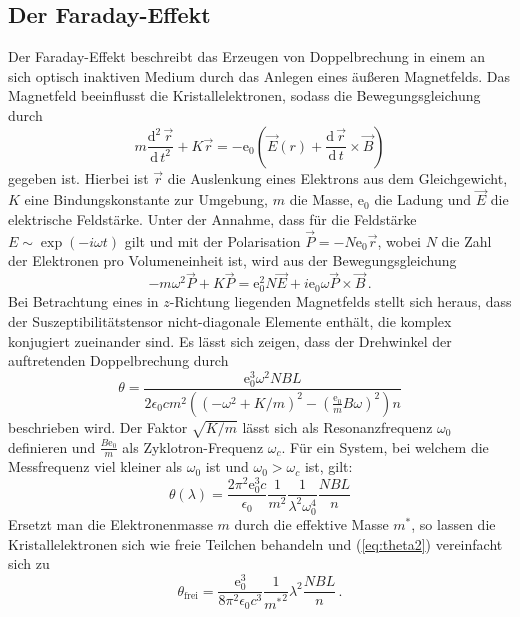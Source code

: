 \subsection{Der Faraday-Effekt}
Der Faraday-Effekt beschreibt das Erzeugen von Doppelbrechung in einem an sich optisch inaktiven Medium durch das Anlegen eines äußeren Magnetfelds. Das Magnetfeld beeinflusst die Kristallelektronen, sodass die Bewegungsgleichung durch
\begin{equation}
  m\frac{\text{d}^2\,\vec{r}}{\text{d}\,t^2}+K\vec{r}=-\text{e}_0\left(\vec{E}(r)+\frac{\text{d}\,\vec{r}}{\text{d}\,t}\times\vec{B}\right)
\end{equation}
gegeben ist. Hierbei ist $\vec{r}$ die Auslenkung eines Elektrons aus dem Gleichgewicht, $K$ eine Bindungskonstante zur Umgebung, $m$ die Masse, e$_0$ die Ladung und $\vec{E}$ die elektrische Feldstärke.
Unter der Annahme, dass für die Feldstärke $E\sim\exp(-i\omega t)$ gilt und mit der Polarisation $\vec{P}=-N\text{e}_0\vec{r}$, wobei $N$ die Zahl der Elektronen pro Volumeneinheit ist, wird aus der Bewegungsgleichung
\begin{equation}
-m\omega^2\vec{P}+K\vec{P}=\text{e}_0^2N\vec{E}+i\text{e}_0\omega\vec{P}\times\vec{B}\,.
\end{equation}
Bei Betrachtung eines in $z$-Richtung liegenden Magnetfelds stellt sich heraus, dass der Suszeptibilitätstensor nicht-diagonale Elemente enthält, die komplex konjugiert zueinander sind.
Es lässt sich zeigen, dass der Drehwinkel der auftretenden Doppelbrechung durch
\begin{equation}
\theta=\frac{\text{e}_0^3\omega^2NBL}{2\epsilon_0cm^2\left(\left(-\omega^2+K/m\right)^2-\left(\frac{\text{e}_0}{m}B\omega\right)^2\right)n}
\end{equation}
beschrieben wird. Der Faktor $\sqrt{K/m}$ lässt sich als Resonanzfrequenz $\omega_0$ definieren und $\frac{B\text{e}_0}{m}$ als Zyklotron-Frequenz $\omega_c$. Für ein System, bei welchem die Messfrequenz viel kleiner als $\omega_0$ ist und $\omega_0>\omega_c$ ist, gilt:
\begin{equation}
\theta(\lambda)=\frac{2\pi^2\text{e}_0^3c}{\epsilon_0}\frac{1}{m^2}\frac{1}{\lambda^2\omega_0^4}\frac{NBL}{n}
\label{eq:theta2}
\end{equation}
Ersetzt man die Elektronenmasse $m$ durch die effektive Masse $m^*$, so lassen die Kristallelektronen sich wie freie Teilchen behandeln und (\ref{eq:theta2}) vereinfacht sich zu
\begin{equation}
\theta_\text{frei}=\frac{\text{e}_0^3}{8\pi^2\epsilon_0c^3}\frac{1}{{m^*}^2}\lambda^2\frac{NBL}{n}\,.
\end{equation}
